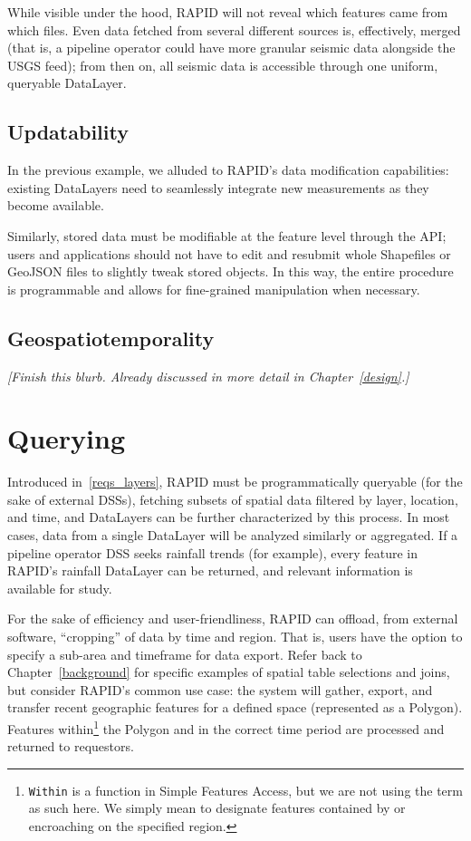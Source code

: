 While visible under the hood, RAPID will not reveal which features came from which files. Even data fetched from several different sources is, effectively, merged (that is, a pipeline operator could have more granular seismic data alongside the USGS feed); from then on, all seismic data is accessible through one uniform, queryable DataLayer.

\subsection{Updatability}
In the previous example, we alluded to RAPID's data modification capabilities: existing DataLayers need to seamlessly integrate new measurements as they become available.

Similarly, stored data must be modifiable at the feature level through the API; users and applications should not have to edit and resubmit whole Shapefiles or GeoJSON files to slightly tweak stored objects. In this way, the entire procedure is programmable and allows for fine-grained manipulation when necessary.

\subsection{Geospatiotemporality}
\textit{[Finish this blurb. Already discussed in more detail in Chapter~\ref{design}.]}

\section{Querying}

Introduced in~\ref{reqs_layers}, RAPID must be programmatically queryable (for the sake of external DSSs), fetching subsets of spatial data filtered by layer, location, and time, and DataLayers can be further characterized by this process. In most cases, data from a single DataLayer will be analyzed similarly or aggregated. If a pipeline operator DSS seeks rainfall trends (for example), every feature in RAPID's rainfall DataLayer can be returned, and relevant information is available for study.

For the sake of efficiency and user-friendliness, RAPID can offload, from external software, ``cropping'' of data by time and region. That is, users have the option to specify a sub-area and timeframe for data export. Refer back to Chapter~\ref{background} for specific examples of spatial table selections and joins, but consider RAPID's common use case: the system will gather, export, and transfer recent geographic features for a defined space (represented as a Polygon). Features within\footnote{\texttt{Within} is a function in Simple Features Access, but we are not using the term as such here. We simply mean to designate features contained by or encroaching on the specified region.} the Polygon and in the correct time period are processed and returned to requestors.

